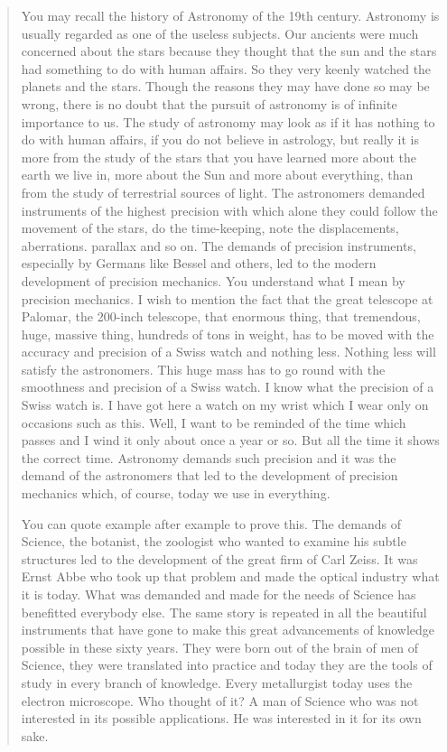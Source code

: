 \begin{quote}
{You may recall the history of Astronomy of the 19th century. Astronomy is usually regarded as one of the useless subjects. Our ancients were much concerned about the stars because they thought that the sun and the stars had something to do with human affairs. So they very keenly watched the planets and the stars. Though the reasons they may have done so may be wrong, there is no doubt that the pursuit of astronomy is of infinite importance to us. The study of astronomy may look as if it has nothing to do with human affairs, if you do not believe in astrology, but really it is more from the study of the stars that you have learned more about the earth we live in, more about the Sun and more about everything, than from the study of terrestrial sources of light. The astronomers demanded instruments of the highest precision with which alone they could follow the movement of the stars, do the time-keeping, note the displacements, aberrations. parallax and so on. The demands of precision instruments, especially by Germans like Bessel and others, led to the modern development of precision mechanics. You understand what I mean by precision mechanics. I wish to mention the fact that the great telescope at Palomar, the 200-inch telescope, that enormous thing, that tremendous, huge, massive thing, hundreds of tons in weight, has to be moved with the accuracy and precision of a Swiss watch and nothing less. Nothing less will satisfy the astronomers. This huge mass has to go round with the smoothness and precision of a Swiss watch. I know what the precision of a Swiss watch is. I have got here a watch on my wrist which I wear only on occasions such as this. Well, I want to be reminded of the time which passes and I wind it only about once a year or so. But all the time it shows the correct time. Astronomy demands such precision and it was the demand of the astronomers that led to the development of precision mechanics which, of course, today we use in everything.

You can quote example after example to prove this. The demands of Science, the botanist, the zoologist who wanted to examine his subtle structures led to the development of the great firm of Carl Zeiss. It was Ernst Abbe who took up that problem and made the optical industry what it is today. What was demanded and made for the needs of Science has benefitted everybody else. The same story is repeated in all the beautiful instruments that have gone to make this great advancements of knowledge possible in these sixty years. They were born out of the brain of men of Science, they were translated into practice and today they are the tools of study in every branch of knowledge. Every metallurgist today uses the electron microscope. Who thought of it? A man of Science who was not interested in its possible applications. He was interested in it for its own sake.

}
\end{quote}
